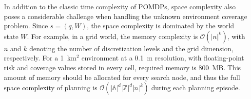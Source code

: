 \documentclass[letterpaper]{article} %
\begin{document}
\noindent
In addition to the classic time complexity of POMDPs, space complexity also poses a considerable challenge when handling the unknown environment coverage problem.
Since $s = (q, W)$, the space complexity is dominated by the world state $W$. 
%
%
For example, in a grid world, the memory complexity is $\mathcal{O}(|n|^k)$, with $n$ and $k$ denoting the number of discretization levels and the grid dimension, respectively. For a 1~km$^2$ environment at a 0.1~m resolution, %
with floating-point risk and coverage values stored in every cell, required memory is 800~MB. This amount of memory should be allocated for every search node, and thus the full space complexity of planning is $\mathcal{O}(|\mathbb{A}|^d |\mathbb{Z}|^d |n|^k)$ during each planning episode.
\end{document}
